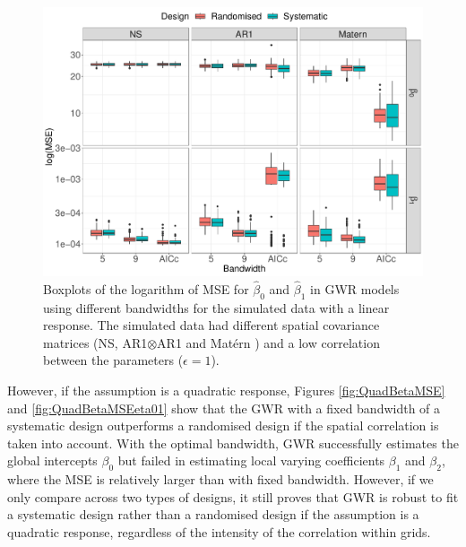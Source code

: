 \documentclass[a4paper]{article} 	%
\newcommand{\Matern}{Mat\'ern }
\begin{document}
\begin{figure}[!htp]
	\centering
	\includegraphics[width=\linewidth]{Col_LinCombMSE_newpar.pdf}
	\caption{Boxplots of the logarithm of MSE for $\hat{\beta}_0$ and $\hat{\beta}_1$ in GWR models using different bandwidths for the simulated data with a linear response. The simulated data had different spatial covariance matrices (NS, AR1$\otimes$AR1 and \Matern) and a low correlation between the parameters ($\epsilon=1$).}\label{fig:LinBetaMSE}
\end{figure}



However, if the assumption is a quadratic response, Figures \ref{fig:QuadBetaMSE} and \ref{fig:QuadBetaMSEeta01} show that the GWR with a fixed bandwidth of a systematic design outperforms a randomised design if the spatial correlation is taken into account. With the optimal bandwidth, GWR successfully estimates the global intercepts $\beta_0$ but failed in estimating local varying coefficients $\beta_1$ and $\beta_2$, where the MSE is relatively larger than with fixed bandwidth. However, if we only compare across two types of designs, it still proves that GWR is robust to fit a systematic design rather than a randomised design if the assumption is a quadratic response, regardless of the intensity of the correlation within grids. 
\end{document}
